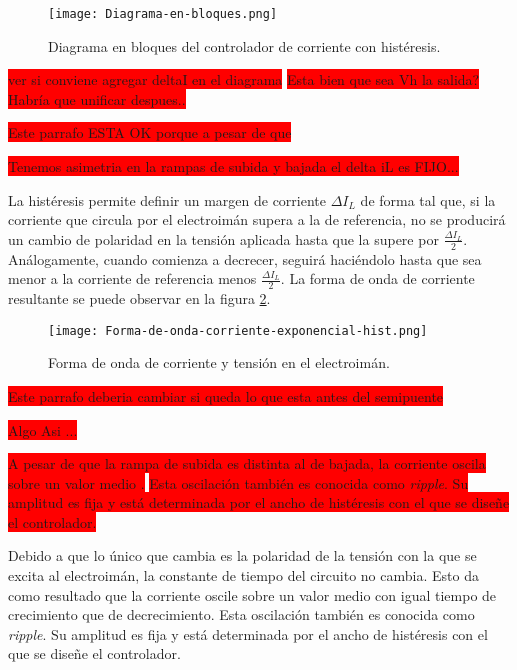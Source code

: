 \begin{figure}[H]
	\centering
	\texttt{[image: Diagrama-en-bloques.png]}
	\caption{Diagrama en bloques del controlador de corriente con histéresis.}
	\label{fig:img_diag-en-bloques}
\end{figure}

\colorbox{red}{ver si conviene agregar deltaI en el diagrama}
\colorbox{red}{Esta bien que sea Vh la salida? Habría que unificar despues..}


\colorbox{red}{Este parrafo ESTA OK porque a pesar de que}

\colorbox{red}{Tenemos asimetria en la rampas de subida y bajada el delta iL es FIJO...}

La histéresis permite definir un margen de corriente $\Delta I_L$ de forma tal que, si la corriente que circula por el electroimán supera a la de referencia, no se producirá un cambio de polaridad en la tensión aplicada hasta que la supere por $\frac{\Delta I_L}{2}$. Análogamente, cuando comienza a decrecer, seguirá haciéndolo hasta que sea menor a la corriente de referencia menos $\frac{\Delta I_L}{2}$. La forma de onda de corriente resultante se puede observar en la figura \ref{fig:img_corriente_exponencial-hist}.

\begin{figure}[H]
	\centering
	\texttt{[image: Forma-de-onda-corriente-exponencial-hist.png]}
	\caption{Forma de onda de corriente y tensión en el electroimán.}
	\label{fig:img_corriente_exponencial-hist}
\end{figure}



\colorbox{red}{Este parrafo deberia cambiar si queda lo que esta antes del semipuente}

\colorbox{red}{Algo Asi ...}

\colorbox{red}{A pesar de que la rampa de subida es distinta al de bajada, la corriente oscila sobre un valor medio .}
\colorbox{red}{ Esta oscilación también es conocida como \textsl{ripple}. Su amplitud es fija y está determinada por el ancho de histéresis con el que se diseñe el controlador. }

Debido a que lo único que cambia es la polaridad de la tensión con la que se excita al electroimán, la constante de tiempo del circuito no cambia. Esto da como resultado  que la corriente oscile sobre un valor medio con igual tiempo de crecimiento que de decrecimiento. Esta oscilación también es conocida como \textsl{ripple}. Su amplitud es fija y está determinada por el ancho de histéresis con el que se diseñe el controlador. 



